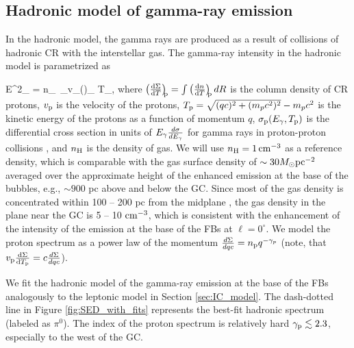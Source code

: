 \subsection{Hadronic model of gamma-ray emission}
\label{sec:Pion_model}

In the hadronic model, the gamma rays are produced as a result of collisions of hadronic CR with the interstellar gas.
The gamma-ray intensity in the hadronic model is parametrized as

\be
E^2_\g {} =  \int n_\Hy\ \sigma_\pr v_\pr \left(\right)_{\!\!\pr} \de T_\pr,
\ee
where $\left(\frac{\text{d} \Sigma}{\text{d} T}\right)_{\!\!\text{p}} = \int \left(\frac{\text{d} n}{\text{d} T}\right)_{\!\!\text{p}} dR$ is the column density 
of CR protons, $v_{\text{p}}$ is the velocity of the protons,
$T_{\text{p}} = \sqrt{(q c)^2 + (m_p c^2)^2} - m_p c^2$ is the kinetic energy of the protons as a function of momentum $q$,
$\sigma_{\text{p}} (E_\gamma, T_{\text{p}})$ is 
the differential cross section in units of $E_\gamma\frac{d\sigma}{d E_\gamma}$
for gamma rays in proton-proton collisions \citep{2006ApJ...647..692K, 2008ApJ...674..278K},
and $n_{\text{H}}$ is the density of gas.
We will use $n_{\text{H}} = \SI{1}{cm^{-3}}$ as a reference density,
which is comparable with the gas surface density of $\sim 30 M_\odot {\rm pc}^{-2}$ \citep{2017ApJ...834...57M}
averaged over the approximate height of the enhanced emission at the base of the bubbles, e.g., $\sim 900$ pc above and below the GC.
Since most of the gas density is concentrated within 100 -- 200 pc from the midplane \citep[e.g.,][]{2013pss5.book..985S, 2017ApJ...834...57M},
the gas density in the plane near the GC is 5 -- 10 ${\rm cm^{-3}}$, which is consistent with the enhancement of the intensity of the emission
at the base of the FBs at $\ell = 0^\circ$.
We model the proton spectrum as a power law of the momentum $\frac{d \Sigma}{d qc} = n_{\text{p}} q^{-\gamma_p}$ 
(note, that $ v_{\text{p}} \frac{\text{d} \Sigma}{\text{d} T_{\text{p}}} = c \frac{d \Sigma}{d qc}$).

We fit the hadronic model of the gamma-ray emission at the base of the FBs analogously to the leptonic model in 
Section \ref{sec:IC_model}.
The dash-dotted line in Figure \ref{fig:SED_with_fits} represents the best-fit hadronic spectrum (labeled as $\pi^0$). 
The index of the proton spectrum is relatively hard $\gamma_{\text{p}} \lesssim 2.3$, especially to the west of the GC.

